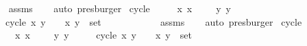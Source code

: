 \begin{isabellebody}
%
\isadelimproof
\ \ %
\endisadelimproof
%
\isatagproof
{}\isamarkupfalse%
\ assms\isanewline
\ \ \isamarkupfalse%
\ auto\ presburger{\isacharplus}%
\endisatagproof
{\isafoldproof}%
%
\isadelimproof
\isanewline
%
\endisadelimproof
\isanewline
{}\isamarkupfalse%
\ cycle{}{\isacharcolon}\isanewline
\ \ \ {\isachardoublequoteopen}{}\ {\isasymle}\ x{\isachardoublequoteclose}\ {\isachardoublequoteopen}x\ {\isacharless}\ {}{\isachardoublequoteclose}\ {\isachardoublequoteopen}{}\ {\isasymle}\ y{\isachardoublequoteclose}\ {\isachardoublequoteopen}y\ {\isacharless}\ {}{\isachardoublequoteclose}\isanewline
\ \ \ {\isachardoublequoteopen}cycle{}\ {\isacharparenleft}x{\isacharcomma}\ y{\isacharparenright}\ {\isacharequal}\ {}\ {\isasymlongleftrightarrow}\ {\isacharparenleft}x{\isacharcomma}\ y{\isacharparenright}\ {\isasymin}\ set\ {\isacharbrackleft}{\isacharparenleft}{}{\isacharcomma}\ {}{\isacharparenright}{\isacharcomma}\ {\isacharparenleft}{}{\isacharcomma}\ {}{\isacharparenright}{\isacharcomma}\ {\isacharparenleft}{}{\isacharcomma}\ {}{\isacharparenright}{\isacharcomma}\ {\isacharparenleft}{}{\isacharcomma}\ {}{\isacharparenright}{\isacharbrackright}{\isachardoublequoteclose}\isanewline
%
\isadelimproof
\ \ %
\endisadelimproof
%
\isatagproof
{}\isamarkupfalse%
\ assms\isanewline
\ \ \isamarkupfalse%
\ auto\ presburger{\isacharplus}%
\endisatagproof
{\isafoldproof}%
%
\isadelimproof
\isanewline
%
\endisadelimproof
\isanewline
{}\isamarkupfalse%
\ cycle{}{\isacharcolon}\isanewline
\ \ \ {\isachardoublequoteopen}{}\ {\isasymle}\ x{\isachardoublequoteclose}\ {\isachardoublequoteopen}x\ {\isacharless}\ {}{\isachardoublequoteclose}\ {\isachardoublequoteopen}{}\ {\isasymle}\ y{\isachardoublequoteclose}\ {\isachardoublequoteopen}y\ {\isacharless}\ {}{\isachardoublequoteclose}\isanewline
\ \ \ {\isachardoublequoteopen}cycle{}\ {\isacharparenleft}x{\isacharcomma}\ y{\isacharparenright}\ {\isacharequal}\ {}\ {\isasymlongleftrightarrow}\ {\isacharparenleft}x{\isacharcomma}\ y{\isacharparenright}\ {\isasymin}\ set\ {\isacharbrackleft}{\isacharparenleft}{}{\isacharcomma}\ {}{\isacharparenright}{\isacharcomma}\ {\isacharparenleft}{}{\isacharcomma}\ {}{\isacharparenright}{\isacharcomma}\ {\isacharparenleft}{}{\isacharcomma}\ {}{\isacharparenright}{\isacharcomma}\ {\isacharparenleft}{}{\isacharcomma}\ {}{\isacharparenright}{\isacharbrackright}{\isachardoublequoteclose}\isanewline

\end{isabellebody}
